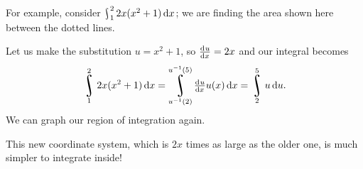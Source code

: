\begin{ex}
  For example, consider $ \rint_1^2 2x(x^2 + 1) \dif{x} $; we are finding the area shown here between the dotted lines.
  \begin{center}
  \end{center}
  Let us make the substitution $ u = x^2 + 1 $, so $ \od{u}{x} = 2x $ and our integral becomes
  \begin{displaymath}
    \rint_1^2 2x(x^2 + 1) \dif{x} = \rint_{u^{-1}(2)}^{u^{-1}(5)} \od{u}{x} u(x) \dif{x} =  \rint_2^5 u \dif{u}.
  \end{displaymath}
  We can graph our region of integration again.
  \begin{center}
  \end{center}
  This new coordinate system, which is $ 2x $ times as large as the older one, is much simpler to integrate inside!
\end{ex}

